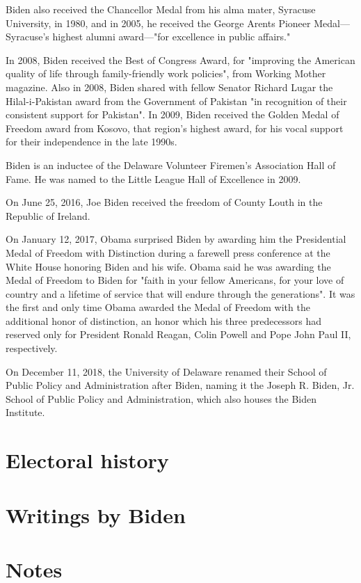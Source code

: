 Biden also received the Chancellor Medal from his alma mater, Syracuse
University, in 1980, and in 2005, he received the George Arents Pioneer
Medal---Syracuse's highest alumni award---"for excellence in public
affairs."

In 2008, Biden received the Best of Congress Award, for "improving the
American quality of life through family-friendly work policies", from
Working Mother magazine. Also in 2008, Biden shared with fellow Senator
Richard Lugar the Hilal-i-Pakistan award from the Government of Pakistan
"in recognition of their consistent support for Pakistan". In 2009,
Biden received the Golden Medal of Freedom award from Kosovo, that
region's highest award, for his vocal support for their independence in
the late 1990s.

Biden is an inductee of the Delaware Volunteer Firemen's Association
Hall of Fame. He was named to the Little League Hall of Excellence in
2009.

On June 25, 2016, Joe Biden received the freedom of County Louth in the
Republic of Ireland.

On January 12, 2017, Obama surprised Biden by awarding him the
Presidential Medal of Freedom with Distinction during a farewell press
conference at the White House honoring Biden and his wife. Obama said he
was awarding the Medal of Freedom to Biden for "faith in your fellow
Americans, for your love of country and a lifetime of service that will
endure through the generations". It was the first and only time Obama
awarded the Medal of Freedom with the additional honor of distinction,
an honor which his three predecessors had reserved only for President
Ronald Reagan, Colin Powell and Pope John Paul II, respectively.

On December 11, 2018, the University of Delaware renamed their School of
Public Policy and Administration after Biden, naming it the Joseph R.
Biden, Jr. School of Public Policy and Administration, which also houses
the Biden Institute.

\section{Electoral history}\label{electoral-history}

\section{Writings by Biden}\label{writings-by-biden}

\section{Notes}\label{notes}


